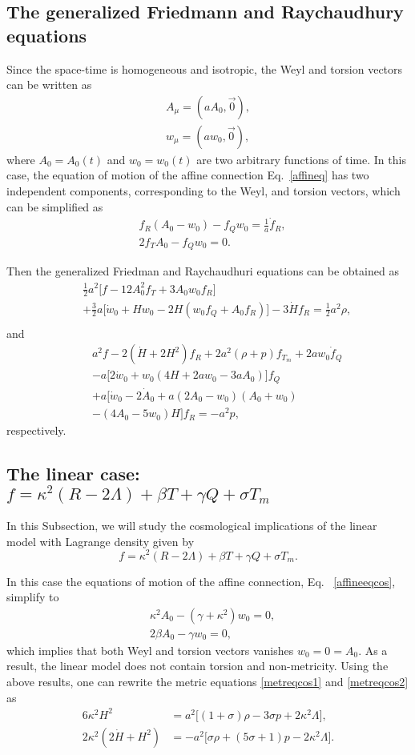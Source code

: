 \documentclass[aps,superscriptaddress, showpacs,preprintnumbers, superscriptaddress, nofootinbibt,twocolumn]{revtex4}
\def\bea{\begin{eqnarray}}
\def\eea{\end{eqnarray}}
\begin{document}
\subsection{The generalized Friedmann and Raychaudhury equations}

Since the space-time is homogeneous and isotropic, the Weyl and torsion vectors can be written as
\begin{align}
A_{\mu}=(aA_0,\vec{0}),\nonumber\\
w_\mu=(aw_0,\vec{0}),
\end{align}
where $A_0=A_0(t)$ and $w_0=w_0(t)$ are two arbitrary functions of time. In this case, the equation of motion of the affine connection Eq.~\eqref{affineq} has two independent components, corresponding to the Weyl, and torsion vectors, which can be simplified as
\begin{align}\label{affineeqcos}
&f_R(A_0-w_0)-f_Q w_0=\frac{1}{a}\dot{f}_R,\nonumber\\
&2f_TA_0-f_Qw_0=0.
\end{align}

Then the generalized Friedman and Raychaudhuri equations can be obtained as \cite{M1a}
\bea\label{metreqcos1}
&&\frac12a^2\Big[f-12A_0^2f_T+3A_0w_0f_R\Big] \nonumber\\
&&+\frac32a\Big[\dot{w}_0+Hw_0-2H(w_0f_Q+A_0f_R)\Big]-3\dot{H}f_R=\frac12a^2\rho,\nonumber\\
\eea
and
\bea\label{metreqcos2}
&&a^2f-2(\dot{H}+2H^2)f_R+2a^2(\rho+p)f_{T_m}+2aw_0\dot{f}_Q\nonumber\\
&&-a\Big[2\dot{w}_0+w_0(4H+2aw_0-3aA_0)\Big]f_Q \nonumber\\
&&+a\Big[\dot{w}_0-2\dot{A}_0+a(2A_0-w_0)(A_0+w_0)\nonumber\\
&&-(4A_0-5w_0)H\Big]f_R=-a^2p,
\eea
respectively.

\subsection{The linear case: $f=\kappa^2(R-2\Lambda)+\beta T+\gamma Q+\sigma T_m$}

In this Subsection, we will study the cosmological implications of the linear model with Lagrange density given by \cite{M1a}
$$f=\kappa^2(R-2\Lambda)+\beta T+\gamma Q+\sigma T_m.$$

In this case the equations of motion of the affine connection, Eq.~ \eqref{affineeqcos}, simplify to
\begin{align}
&\kappa^2A_0-(\gamma+\kappa^2)w_0=0,\nonumber\\
&2\beta A_0-\gamma w_0=0,
\end{align}
which implies that both Weyl and torsion vectors vanishes $w_0=0=A_0$. As a result, the linear model does not contain torsion and non-metricity. Using the above results, one can rewrite the metric equations \eqref{metreqcos1} and \eqref{metreqcos2} as
\begin{align}
6\kappa^2 H^2&=a^2\Big[(1+\sigma)\rho-3\sigma p+2\kappa^2\Lambda\Big],\nonumber\\
2\kappa^2(2\dot{H}+H^2)&=-a^2\Big[\sigma\rho+(5\sigma+1)p-2\kappa^2\Lambda\Big].
\end{align}
\end{document}
